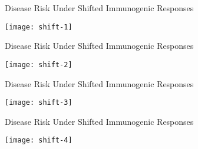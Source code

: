 \documentclass{beamer}
\begin{document}

\begin{frame}[c]{Disease Risk Under Shifted Immunogenic Responses}

\hspace*{-1cm}\texttt{[image: shift-1]}

\note{
}

\end{frame}


\begin{frame}[c]{Disease Risk Under Shifted Immunogenic Responses}

\hspace*{-1cm}\texttt{[image: shift-2]}

\note{
}

\end{frame}


\begin{frame}[c]{Disease Risk Under Shifted Immunogenic Responses}

\hspace*{-1cm}\texttt{[image: shift-3]}

\note{
}

\end{frame}


\begin{frame}[c]{Disease Risk Under Shifted Immunogenic Responses}

\hspace*{-1cm}\texttt{[image: shift-4]}

\note{
}

\end{frame}


\end{document}
